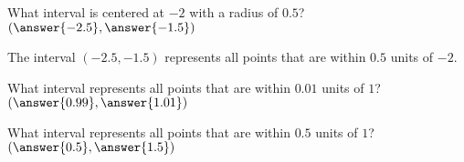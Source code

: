 \documentclass{ximera}
\begin{document}
\begin{exercise}
    \begin{question}
    	What interval is centered at $-2$ with a radius of $ 0.5$? $\left( \answer{-2.5}, \answer{-1.5}\right)$
    	\begin{feedback}
    		The interval $(-2.5, -1.5)$ represents all points that are within $0.5$ units of $-2$.
    	\end{feedback}
    \end{question}
    \begin{question}
    	What interval represents all points that are within $0.01$ units of $1$?  $\left( \answer{0.99}, \answer{1.01} \right)$
    \end{question}
 	\begin{question}
 		What interval represents all points that are within $0.5$ units of $1$?  $\left( \answer{0.5}, \answer{1.5}\right)$
 	\end{question}
    \end{exercise}
\end{document}
